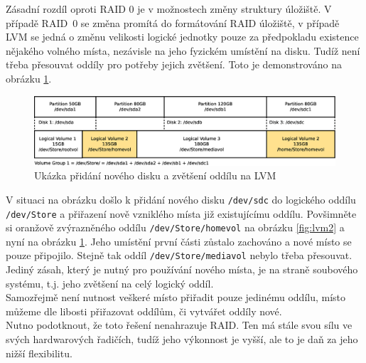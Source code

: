 Zásadní rozdíl oproti RAID 0 je v možnostech změny struktury úložiště. V případě RAID~0 se změna promítá do formátování RAID úložiště, v případě LVM se jedná o změnu velikosti logické jednotky pouze za předpokladu existence nějakého volného místa, nezávisle na jeho fyzickém umístění na disku. Tudíž není třeba přesouvat oddíly pro potřeby jejich zvětšení. Toto je demonstrováno na obrázku \ref{fig:lvm3}.\\
\begin{figure}[] 
    \centering
    \includegraphics[scale=0.32]{obrazky/lvm3.eps}
    \caption{Ukázka přidání nového disku a zvětšení oddílu na LVM}
    \label{fig:lvm3}
\end{figure}V situaci na obrázku došlo k přidání nového disku \texttt{/dev/sdc} do logického oddílu \texttt{/dev/Store} a přiřazení nově vzniklého místa již existujícímu oddílu. Povšimněte si oranžově zvýrazněného oddílu \texttt{/dev/Store/homevol} na obrázku \ref{fig:lvm2} a nyní na obrázku \ref{fig:lvm3}. Jeho umístění první části zůstalo zachováno a nové místo se pouze připojilo. Stejně tak oddíl \texttt{/dev/Store/mediavol} nebylo třeba přesouvat. Jediný zásah, který je nutný pro používání nového místa, je na straně soubového systému, t.j. jeho zvětšení na celý logický oddíl.\\
Samozřejmě není nutnost veškeré místo přiřadit pouze jedinému oddílu, místo můžeme dle libosti přiřazovat oddílům, či vytvářet oddíly nové.\\
Nutno podotknout, že toto řešení nenahrazuje RAID. Ten má stále svou sílu ve svých hardwarových řadičích, tudíž jeho výkonnost je vyšší, ale to je daň za jeho nižší flexibilitu.

